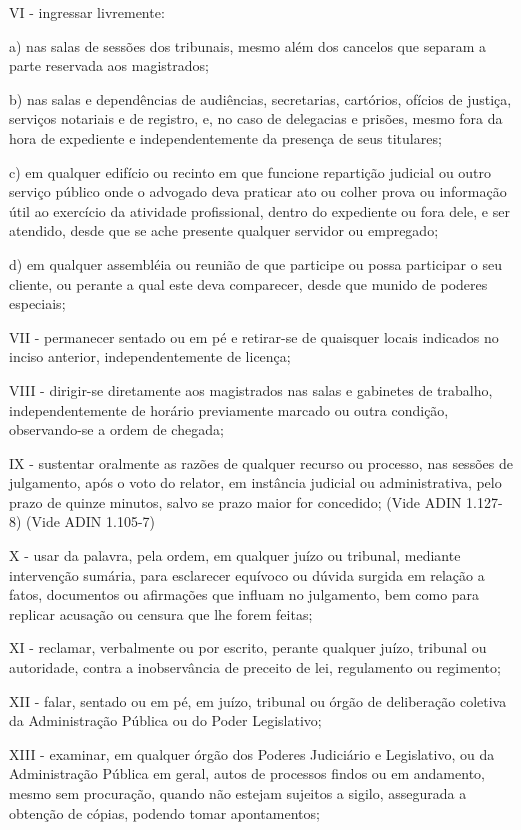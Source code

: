 \documentclass[12pt]{article}
\begin{document}
VI - ingressar livremente:

a) nas salas de sessões dos tribunais, mesmo além dos cancelos que separam a parte reservada aos magistrados;

b) nas salas e dependências de audiências, secretarias, cartórios, ofícios de justiça, serviços notariais e de registro, e, no caso de delegacias e prisões, mesmo fora da hora de expediente e independentemente da presença de seus titulares;

c) em qualquer edifício ou recinto em que funcione repartição judicial ou outro serviço público onde o advogado deva praticar ato ou colher prova ou informação útil ao exercício da atividade profissional, dentro do expediente ou fora dele, e ser atendido, desde que se ache presente qualquer servidor ou empregado;

d) em qualquer assembléia ou reunião de que participe ou possa participar o seu cliente, ou perante a qual este deva comparecer, desde que munido de poderes especiais;

VII - permanecer sentado ou em pé e retirar-se de quaisquer locais indicados no inciso anterior, independentemente de licença;

VIII - dirigir-se diretamente aos magistrados nas salas e gabinetes de trabalho, independentemente de horário previamente marcado ou outra condição, observando-se a ordem de chegada;

IX - sustentar oralmente as razões de qualquer recurso ou processo, nas sessões de julgamento, após o voto do relator, em instância judicial ou administrativa, pelo prazo de quinze minutos, salvo se prazo maior for concedido;       (Vide ADIN 1.127-8)      (Vide ADIN 1.105-7)

X - usar da palavra, pela ordem, em qualquer juízo ou tribunal, mediante intervenção sumária, para esclarecer equívoco ou dúvida surgida em relação a fatos, documentos ou afirmações que influam no julgamento, bem como para replicar acusação ou censura que lhe forem feitas;

XI - reclamar, verbalmente ou por escrito, perante qualquer juízo, tribunal ou autoridade, contra a inobservância de preceito de lei, regulamento ou regimento;

XII - falar, sentado ou em pé, em juízo, tribunal ou órgão de deliberação coletiva da Administração Pública ou do Poder Legislativo;

XIII - examinar, em qualquer órgão dos Poderes Judiciário e Legislativo, ou da Administração Pública em geral, autos de processos findos ou em andamento, mesmo sem procuração, quando não estejam sujeitos a sigilo, assegurada a obtenção de cópias, podendo tomar apontamentos;
\end{document}
